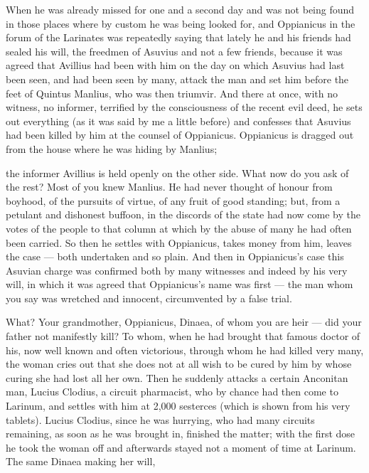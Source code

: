  When he was already missed for one and a second day and was not being found in those places where by custom he was being looked for, and Oppianicus in the forum of the Larinates was repeatedly saying that lately he and his friends had sealed his will, the freedmen of Asuvius and not a few friends, because it was agreed that Avillius had been with him on the day on which Asuvius had last been seen, and had been seen by many, attack the man and set him before the feet of Quintus Manlius, who was then triumvir. And there at once, with no witness, no informer, terrified by the consciousness of the recent evil deed, he sets out everything (as it was said by me a little before) and confesses that Asuvius had been killed by him at the counsel of Oppianicus. Oppianicus is dragged out from the house where he was hiding by Manlius;

 the informer Avillius is held openly on the other side. What now do you ask of the rest? Most of you knew Manlius. He had never thought of honour from boyhood, of the pursuits of virtue, of any fruit of good standing; but, from a petulant and dishonest buffoon, in the discords of the state had now come by the votes of the people to that column at which by the abuse of many he had often been carried. So then he settles with Oppianicus, takes money from him, leaves the case --- both undertaken and so plain. And then in Oppianicus's case this Asuvian charge was confirmed both by many witnesses and indeed by his very will, in which it was agreed that Oppianicus's name was first --- the man whom you say was wretched and innocent, circumvented by a false trial.

 What? Your grandmother, Oppianicus, Dinaea, of whom you are heir --- did your father not manifestly kill? To whom, when he had brought that famous doctor of his, now well known and often victorious, through whom he had killed very many, the woman cries out that she does not at all wish to be cured by him by whose curing she had lost all her own. Then he suddenly attacks a certain Anconitan man, Lucius Clodius, a circuit pharmacist, who by chance had then come to Larinum, and settles with him at 2,000 sesterces (which is shown from his very tablets). Lucius Clodius, since he was hurrying, who had many circuits remaining, as soon as he was brought in, finished the matter; with the first dose he took the woman off and afterwards stayed not a moment of time at Larinum. The same Dinaea making her will,

